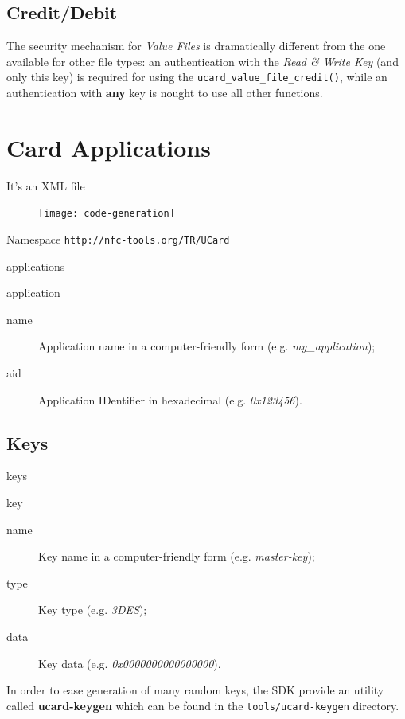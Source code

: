 \documentclass{article}
\begin{document}
\subsection{Credit/Debit}

The security mechanism for \emph{Value Files} is dramatically
different from the one available for other file types: an
authentication with the \emph{Read \& Write Key} (and only this key)
is required for using the \texttt{ucard\_value\_file\_credit()}, while
an authentication with \textbf{any} key is nought to use all other
functions.

\section{Card Applications}


It's an XML file

\begin{figure}[htp]
  \centering
  \texttt{[image: code-generation]}
\end{figure}

Namespace \texttt{http://nfc-tools.org/TR/UCard}

applications

application
\begin{description}
	\item[name] Application name in a computer-friendly form (e.g.
	\emph{my\_application});
	\item[aid] Application IDentifier in hexadecimal (e.g. \emph{0x123456}).
\end{description}

\subsection{Keys}

keys

key
\begin{description}
	\item[name] Key name in a computer-friendly form (e.g.
	\emph{master-key});
	\item[type] Key type (e.g. \emph{3DES});
	\item[data] Key data (e.g. \emph{0x0000000000000000}).
\end{description}


\begin{note}
In order to ease generation of many random keys, the SDK provide an
utility called \textbf{ucard-keygen} which can be found in the
\texttt{tools/ucard-keygen} directory.
\end{note}
\end{document}
